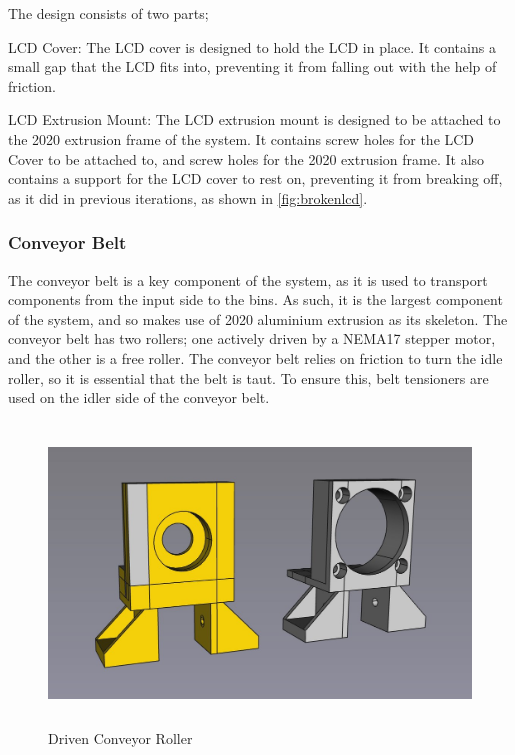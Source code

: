 The design consists of two parts;
\begin{mylist}
    \item LCD Cover: The LCD cover is designed to hold the LCD in place. It contains a small gap that the LCD fits into, preventing it from falling out with the help of friction.
    \item LCD Extrusion Mount: The LCD extrusion mount is designed to be attached to the 2020 extrusion frame of the system. It contains screw holes for the LCD Cover to be attached to, and screw holes for the 2020 extrusion frame. It also contains a support for the LCD cover to rest on, preventing it from breaking off, as it did in previous iterations, as shown in \autoref{fig:brokenlcd}.
\end{mylist}

\subsubsection{Conveyor Belt}
\label{sec:conveyor-belt}
The conveyor belt is a key component of the system, as it is used to transport components from the input side to the bins. As such, it is the largest component of the system, and so makes use of 2020 aluminium extrusion as its skeleton. The conveyor belt has two rollers; one actively driven by a NEMA17 stepper motor, and the other is a free roller. The conveyor belt relies on friction to turn the idle roller, so it is essential that the belt is taut. To ensure this, belt tensioners are used on the idler side of the conveyor belt.

\begin{figure}[H]
    \begin{minipage}[h]{0.95\textwidth}
        \centering
        \includegraphics[height=8cm]{imgs/freecad/conveyor_driven.jpg}
        \caption{Driven Conveyor Roller}
        \label{fig:conveyordriven}
    \end{minipage}
\end{figure}

